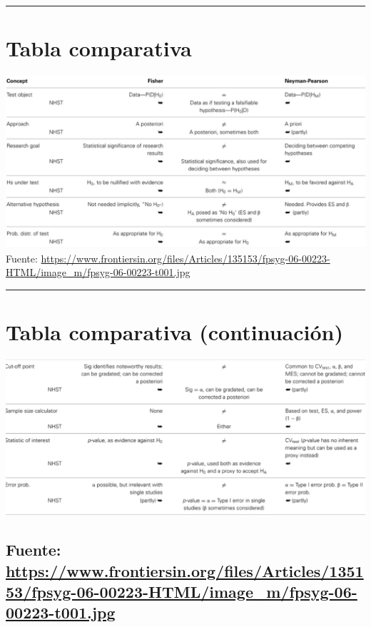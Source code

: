 \documentclass[
]{article}
\begin{document}
\begin{center}\rule{0.5\linewidth}{0.5pt}\end{center}

\hypertarget{tabla-comparativa}{%
\section{Tabla comparativa}\label{tabla-comparativa}}

\includegraphics{figs/tabla1.1.png} Fuente:
\url{https://www.frontiersin.org/files/Articles/135153/fpsyg-06-00223-HTML/image_m/fpsyg-06-00223-t001.jpg}

\begin{center}\rule{0.5\linewidth}{0.5pt}\end{center}

\hypertarget{tabla-comparativa-continuaciuxf3n}{%
\section{Tabla comparativa
(continuación)}\label{tabla-comparativa-continuaciuxf3n}}

\includegraphics{figs/tabla1.2.png}

\hypertarget{fuente-httpswww.frontiersin.orgfilesarticles135153fpsyg-06-00223-htmlimage_mfpsyg-06-00223-t001.jpg}{%
\subsection{\texorpdfstring{Fuente:
\url{https://www.frontiersin.org/files/Articles/135153/fpsyg-06-00223-HTML/image_m/fpsyg-06-00223-t001.jpg}}{Fuente: https://www.frontiersin.org/files/Articles/135153/fpsyg-06-00223-HTML/image\_m/fpsyg-06-00223-t001.jpg}}\label{fuente-httpswww.frontiersin.orgfilesarticles135153fpsyg-06-00223-htmlimage_mfpsyg-06-00223-t001.jpg}}
\end{document}
